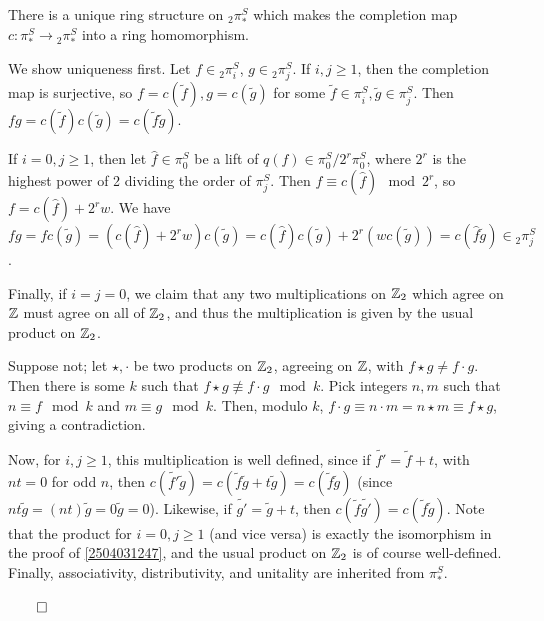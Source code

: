 \documentclass{MetricNotes2023}
\def\inte{\ensuremath\mathbb{Z}}
\def\done{\begin{flushright}\vspace{-4.35ex}\(\qed\)\end{flushright}}
\begin{document}
\begin{lemma}\label{2504071013}
There is a unique ring structure on \(\text{}_2\pi_*^S\) which makes the completion map \(c : \pi_*^S \to \text{}_2\pi_*^S\) into a ring homomorphism. 
\end{lemma}

\begin{ourproof}
We show uniqueness first. Let \(f \in \text{}_2\pi_i^S\), \(g \in \text{}_2\pi_j^S\). If \(i,j \geq 1\), then the completion map is surjective, so \(f=c(\tilde f), g = c(\tilde g)\) for some \(\tilde f \in \pi_i^S, \tilde g \in \pi_j^S\). Then \(fg=c(\tilde f)c(\tilde g)=c(\tilde f \tilde g)\).

If \(i=0, j\geq 1\), then let \(\hat f\in \pi_0^S\) be a lift of \(q(f)\in \pi_0^S/2^r\pi_0^S\), where \(2^r\) is the highest power of 2 dividing the order of \(\pi_j^S\). Then \(f\equiv c(\hat f) \mod 2^r\), so \(f=c(\hat f) + 2^rw\). We have \(fg=fc(\tilde g)=(c(\hat f) + 2^r w)c(\tilde g)=c(\hat f) c(\tilde g)+2^r(wc(\tilde g))=c(\hat f \tilde g)\in \text{}_2\pi_j^S\). 

Finally, if \(i=j=0\), we claim that any two multiplications on \(\inte_2\) which agree on \(\inte\) must agree on all of \(\inte_2\), and thus the multiplication is given by the usual product on \(\inte_2\). 

Suppose not; let \(\star, \cdot\) be two products on \(\inte_2\), agreeing on \(\inte\), with \(f\star g \neq f \cdot g\). Then there is some \(k\) such that \(f \star g \not\equiv f \cdot g \mod k\). Pick integers \(n, m\) such that \(n\equiv f \mod k\) and \(m \equiv g \mod k\). Then, modulo \(k\), \(f\cdot g \equiv n\cdot m =n\star m \equiv f \star g\), giving a contradiction.

Now, for \(i, j \geq 1\), this multiplication is well defined, since if \(\tilde{f'}=\tilde f+t\), with \(nt=0\) for odd \(n\), then \(c(\tilde{f'}\tilde g)=c(\tilde f \tilde g + t\tilde g)=c(\tilde f \tilde g)\) (since \(nt\tilde g=(nt)\tilde g = 0\tilde g = 0\)). Likewise, if \(\tilde{g'}=\tilde g + t\), then \(c(\tilde f \tilde{g'})=c(\tilde f \tilde g)\). Note that the product for \(i=0, j \geq 1\)  (and vice versa) is exactly the isomorphism in the proof of \ref{2504031247}, and the usual product on \(\inte_2\) is of course well-defined. Finally, associativity, distributivity, and unitality are inherited from \(\pi_*^S\). \done
\end{ourproof}
\end{document}
